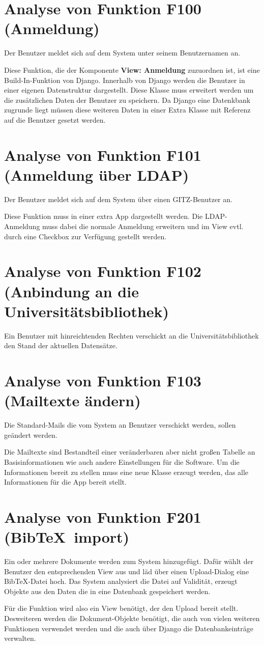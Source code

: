 \section{Analyse von Funktion F100 (Anmeldung)}
Der Benutzer meldet sich auf dem System unter seinem Benutzernamen an.

Diese Funktion, die der Komponente \textbf{View: Anmeldung} zuzuordnen ist, ist
eine Build-In-Funktion von Django. Innerhalb von Django werden die Benutzer
in einer eigenen Datenstruktur  dargestellt. Diese Klasse muss erweitert werden
um die zusätzlichen Daten der Benutzer zu speichern. Da Django eine Datenkbank
zugrunde liegt müssen diese weiteren Daten in einer Extra Klasse mit Referenz
auf die Benutzer gesetzt werden.

\section{Analyse von Funktion F101 (Anmeldung über LDAP)}
Der Benutzer meldet sich auf dem System über einen GITZ-Benutzer an.

Diese Funktion muss in einer extra App dargestellt werden. Die LDAP-Anmeldung
muss dabei die normale Anmeldung erweitern und im View evtl. durch eine Checkbox
zur Verfügung gestellt werden.

\section{Analyse von Funktion F102 (Anbindung an die Universitätsbibliothek)}
Ein Benutzer mit hinreichtenden Rechten verschickt an die Universitätsbibliothek
den Stand der aktuellen Datensätze.

\section{Analyse von Funktion F103 (Mailtexte ändern)}
Die Standard-Mails die vom System an Benutzer verschickt werden, sollen geändert
werden.

Die Mailtexte sind Bestandteil einer veränderbaren aber nicht großen Tabelle an
Basisinformationen wie auch andere Einstellungen für die Software. Um die
Informationen bereit zu stellen muss eine neue Klasse erzeugt werden, das alle
Informationen für die App bereit stellt.

\section{Analyse von Funktion F201 (Bib\TeX\ import)}
Ein oder mehrere Dokumente werden zum System hinzugefügt. Dafür wählt der
Benutzer den entsprechenden View aus und läd über einen Upload-Dialog eine
Bib\TeX -Datei hoch. Das System analysiert die Datei auf Validität, erzeugt
Objekte aus den Daten die in eine Datenbank gespeichert werden.

Für die Funktion wird also ein View benötigt, der den Upload bereit stellt.
Desweiteren werden die Dokument-Objekte benötigt, die auch von vielen weiteren
Funktionen verwendet werden und die auch über Django die Datenbankeinträge
verwalten.
